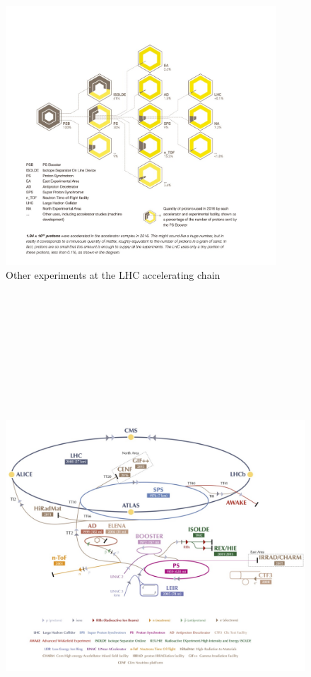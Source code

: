 {{{%
\begin{figure}[!htbp]
	\centering
	\includegraphics[width=0.9\textwidth]{figures/LHC/distribution_of_protons_en.jpg}
	\caption{Other experiments at the LHC accelerating chain~\cite{Pralavorio2017}}
	\label{fig:OtherExpAtAccStructure}
\end{figure}
\begin{figure}[!htbp]
	\centering
	\includegraphics[width=1.15\textwidth,height=19cm]{figures/LHC/CERN_Accelerator_Complex-v2016.jpg}

\end{figure}}}}
